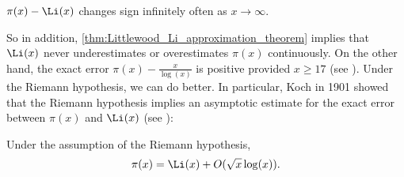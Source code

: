       \begin{proposition}\label{thm:Littlewood_Li_approximation_theorem}
        $\pi(x)-\Li(x)$ changes sign infinitely often as $x \to \infty$.
      \end{proposition}

      So in addition, \cref{thm:Littlewood_Li_approximation_theorem} implies that $\Li(x)$ never underestimates or overestimates $\pi(x)$ continuously. On the other hand, the exact error $\pi(x)-\frac{x}{\log(x)}$ is positive provided $x \ge 17$ (see \cite{rosser1962approximate}). Under the Riemann hypothesis, we can do better. In particular, Koch in 1901 showed that the Riemann hypothesis implies an asymptotic estimate for the exact error between $\pi(x)$ and $\Li(x)$ (see \cite{von1901distribution}):

      \begin{proposition}
        Under the assumption of the Riemann hypothesis,
        \[
          \pi(x) = \Li(x)+O(\sqrt{x}\log(x)).
        \]
      \end{proposition}